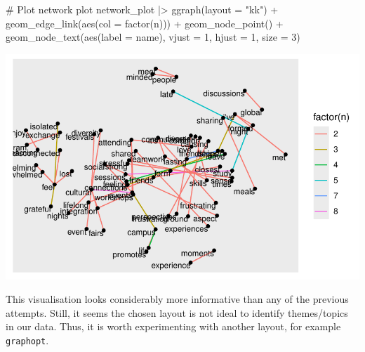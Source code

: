 \documentclass[
  letterpaper,
  DIV=11,
  numbers=noendperiod]{scrreprt}
\newenvironment{Shaded}{\begin{snugshade}}{\end{snugshade}}
\newcommand{\AttributeTok}[1]{\textcolor[rgb]{0.40,0.45,0.13}{#1}}
\newcommand{\CommentTok}[1]{\textcolor[rgb]{0.37,0.37,0.37}{#1}}
\newcommand{\DecValTok}[1]{\textcolor[rgb]{0.68,0.00,0.00}{#1}}
\newcommand{\FunctionTok}[1]{\textcolor[rgb]{0.28,0.35,0.67}{#1}}
\newcommand{\NormalTok}[1]{\textcolor[rgb]{0.00,0.23,0.31}{#1}}
\newcommand{\SpecialCharTok}[1]{\textcolor[rgb]{0.37,0.37,0.37}{#1}}
\newcommand{\StringTok}[1]{\textcolor[rgb]{0.13,0.47,0.30}{#1}}
\begin{document}
\begin{Shaded}
\begin{Highlighting}[]
\CommentTok{\# Plot network plot}
\NormalTok{network\_plot }\SpecialCharTok{|\textgreater{}}
  \FunctionTok{ggraph}\NormalTok{(}\AttributeTok{layout =} \StringTok{"kk"}\NormalTok{) }\SpecialCharTok{+}
  \FunctionTok{geom\_edge\_link}\NormalTok{(}\FunctionTok{aes}\NormalTok{(}\AttributeTok{col =} \FunctionTok{factor}\NormalTok{(n))) }\SpecialCharTok{+}
  \FunctionTok{geom\_node\_point}\NormalTok{() }\SpecialCharTok{+}
  \FunctionTok{geom\_node\_text}\NormalTok{(}\FunctionTok{aes}\NormalTok{(}\AttributeTok{label =}\NormalTok{ name),}
                 \AttributeTok{vjust =} \DecValTok{1}\NormalTok{,}
                 \AttributeTok{hjust =} \DecValTok{1}\NormalTok{,}
                 \AttributeTok{size =} \DecValTok{3}\NormalTok{)}
\end{Highlighting}
\end{Shaded}

\includegraphics{14_mixed_methods_files/figure-pdf/ngrams-network-plot-step-three-1.pdf}

This visualisation looks considerably more informative than any of the
previous attempts. Still, it seems the chosen layout is not ideal to
identify themes/topics in our data. Thus, it is worth experimenting with
another layout, for example \texttt{graphopt}.
\end{document}
